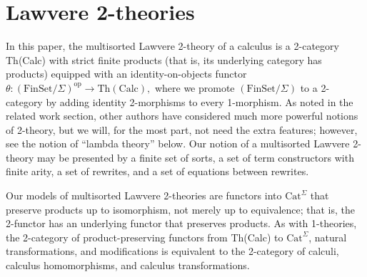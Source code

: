 \documentclass{llncs}
\newcommand{\maps}{\colon}
\newcommand{\FinSet}{\mathrm{FinSet}}
\newcommand{\Cat}{\mathrm{Cat}}
\newcommand{\op}{\mathrm{op}}
\begin{document}
\section {Lawvere 2-theories}
In this paper, the multisorted Lawvere 2-theory of a calculus is a 2-category Th(Calc) with strict finite products (that is, its underlying category has products) equipped with an identity-on-objects functor $\theta\maps (\FinSet/\Sigma)^\op \to \mathrm{Th(Calc)},$ where we promote $(\FinSet/\Sigma)$ to a 2-category by adding identity 2-morphisms to every 1-morphism.  As noted in the related work section, other authors have considered much more powerful notions of 2-theory, but we will, for the most part, not need the extra features; however, see the notion of ``lambda theory'' below.  Our notion of a multisorted Lawvere 2-theory may be presented by a finite set of sorts, a set of term constructors with finite arity, a set of rewrites, and a set of equations between rewrites.  

Our models of multisorted Lawvere 2-theories are functors into $\Cat^\Sigma$ that preserve products up to isomorphism, not merely up to equivalence; that is, the 2-functor has an underlying functor that preserves products.  As with 1-theories, the 2-category of product-preserving functors from Th(Calc) to $\Cat^\Sigma$, natural transformations, and modifications is equivalent to the 2-category of calculi, calculus homomorphisms, and calculus transformations.
\end{document}
